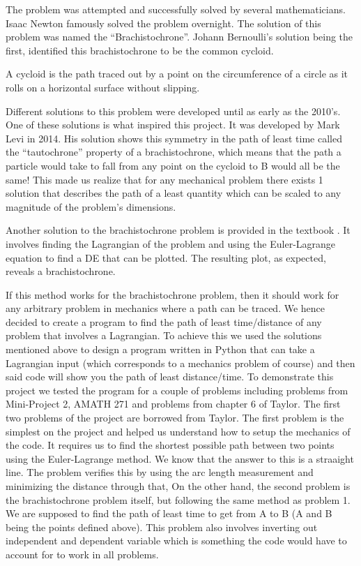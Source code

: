 \documentclass[hidelinks, 11pt]{article}
\begin{document}
The problem was attempted and successfully solved by several mathematicians. Isaac Newton famously solved the problem overnight. The solution of this problem was named the “Brachistochrone”.  Johann Bernoulli’s solution being the first, identified this brachistochrone to be the common cycloid. 


A cycloid is the path traced out by a point on the circumference of a circle as it rolls on a horizontal surface without slipping. 

Different solutions to this problem were developed until as early as the 2010's. One of these solutions is what inspired this project. It was developed by Mark Levi \cite{Levi2014} in 2014. His solution shows this symmetry in the path of least time called the “tautochrone” property of a brachistochrone, which means that the path a particle would take to fall from any point on the cycloid to B would all be the same! This made us realize that for any mechanical problem there exists 1 solution that describes the path of a least quantity which can be scaled to any magnitude of the problem’s dimensions. 

Another solution to the brachistochrone problem is provided in the textbook \cite{Taylor2005}. It involves finding the Lagrangian of the problem and using the Euler-Lagrange equation to find a DE that can be plotted. The resulting plot, as expected, reveals a brachistochrone.

If this method works for the brachistochrone problem, then it should work for any arbitrary problem in mechanics where a path can be traced. 
We hence decided to create a program to find the path of least time/distance of any problem that involves a Lagrangian. To achieve this we used the solutions mentioned above to design a program written in Python that can take a Lagrangian input (which corresponds to a mechanics problem of course) and then said code will show you the path of least distance/time. 
To demonstrate this project we tested the program for a couple of problems including problems from Mini-Project 2, AMATH 271 and problems from chapter 6 of Taylor.
The first two problems of the project are borrowed from Taylor. The first problem is the simplest on the project and helped us understand how to setup the mechanics of the code. It requires us to find the shortest possible path between two points using the Euler-Lagrange method. We know that the answer to this is a straaight line. The problem verifies this by using the arc length measurement and minimizing the distance through that, On the other hand, the second problem is the brachistochrone problem itself, but following the same method as problem 1. We are supposed to find the path of least time to get from A to B (A and B being the points defined above). This problem also involves inverting out independent and dependent variable which is something the code would have to account for to work in all problems. 
\end{document}
